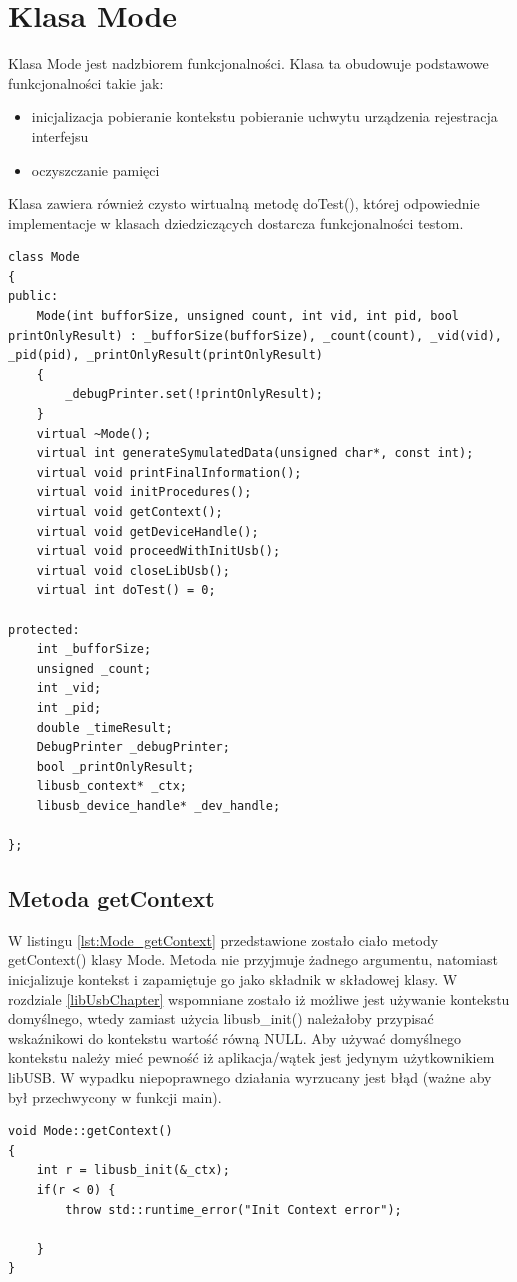 \documentclass{BscUS}
\begin{document}
\section{Klasa Mode}
Klasa Mode jest nadzbiorem funkcjonalności. Klasa ta obudowuje podstawowe funkcjonalności takie jak:
\begin{itemize}
\item inicjalizacja
\subitem pobieranie kontekstu
\subitem pobieranie uchwytu urządzenia
\subitem rejestracja interfejsu
\item oczyszczanie pamięci
\end{itemize}
Klasa zawiera również czysto wirtualną metodę doTest(), której odpowiednie implementacje w klasach dziedziczących dostarcza funkcjonalności testom.
\begin{lstlisting}[caption={Deklaracja klasy Mode},label={lst:CMode}]
class Mode
{
public:
	Mode(int bufforSize, unsigned count, int vid, int pid, bool printOnlyResult) : _bufforSize(bufforSize), _count(count), _vid(vid), _pid(pid), _printOnlyResult(printOnlyResult)
	{
		_debugPrinter.set(!printOnlyResult);
	}
	virtual ~Mode();
	virtual int generateSymulatedData(unsigned char*, const int);
	virtual void printFinalInformation();
	virtual void initProcedures();
	virtual void getContext();
	virtual void getDeviceHandle();
	virtual void proceedWithInitUsb();
	virtual void closeLibUsb();
	virtual int doTest() = 0;
	
protected:
	int _bufforSize;
	unsigned _count;
	int _vid;
	int _pid;
	double _timeResult;
	DebugPrinter _debugPrinter;
	bool _printOnlyResult;
	libusb_context* _ctx;
	libusb_device_handle* _dev_handle;

};
\end{lstlisting}
\subsection{Metoda getContext}
W listingu \ref{lst:Mode_getContext} przedstawione zostało ciało metody getContext() klasy Mode.
\newline
Metoda nie przyjmuje żadnego argumentu, natomiast inicjalizuje kontekst i zapamiętuje go jako składnik w składowej klasy. W rozdziale \ref{libUsbChapter} wspomniane zostało iż możliwe jest używanie kontekstu domyślnego, wtedy zamiast użycia libusb\_init() należałoby przypisać wskaźnikowi do kontekstu wartość równą NULL. 
\newline
Aby używać domyślnego kontekstu należy mieć pewność iż aplikacja/wątek jest jedynym użytkownikiem libUSB.
\newline
W wypadku niepoprawnego działania wyrzucany jest błąd (ważne aby był przechwycony w funkcji main).
\begin{lstlisting}[caption={Metoda Mode::getContext()},label={lst:Mode_getContext}]
void Mode::getContext()
{	
	int r = libusb_init(&_ctx);
	if(r < 0) {
		throw std::runtime_error("Init Context error");

	}
}
\end{lstlisting}
\end{document}
